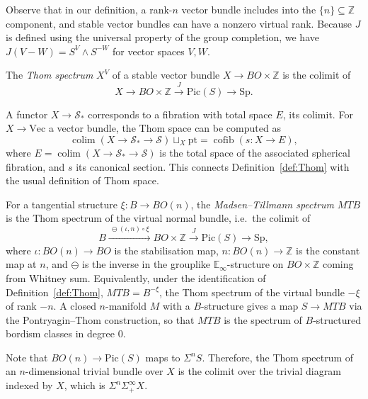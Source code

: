\documentclass{amsart}
\begin{document}
\begin{remark}
\label{rmk:J-on-virtual-bundles}
Observe that in our definition, a rank-$n$ vector bundle includes into the $\{n\} \subseteq \mathbb{Z}$ component, and stable vector bundles can have a nonzero virtual rank. Because $J$ is defined using the universal property of the group completion, we have $J(V - W) = S^V \wedge S^{-W}$ for vector spaces $V, W$.
\end{remark}

\begin{definition}
\label{def:Thom}
The \emph{Thom spectrum} $X^V$ of a stable vector bundle $X \to BO \times \mathbb{Z}$ is the colimit of
\[
X \to BO \times \mathbb{Z} \xrightarrow{\ J\ } \mathrm{Pic}(S) \to \mathrm{Sp}.
\]
\end{definition}

\begin{remark}
\label{rmk:Thom-as-cofib}
A functor $X \to \mathcal{S}_*$ corresponds to a fibration with total space $E$, its colimit. For $X \to \mathrm{Vec}$ a vector bundle, the Thom space can be computed as
\[
\operatorname*{colim}(X \to \mathcal{S}_* \to \mathcal{S}) \sqcup_X \mathrm{pt} = \operatorname*{cofib}(s \colon X \to E),
\]
where $E = \operatorname*{colim}(X \to \mathcal{S}_* \to \mathcal{S})$ is the total space of the associated spherical fibration, and $s$ its canonical section. This connects Definition~\ref{def:Thom} with the usual definition of Thom space.
\end{remark}

\begin{definition}
\label{def:MTB}
For a tangential structure $\xi \colon B \to BO(n)$, the \emph{Madsen--Tillmann spectrum} $MTB$ is the Thom spectrum of the virtual normal bundle, i.e.\ the colimit of
\[
B \xrightarrow{\ \ominus(\iota, n) \circ \xi\ } BO \times \mathbb{Z} \xrightarrow{\ J\ } \mathrm{Pic}(S) \to \mathrm{Sp},
\]
where $\iota \colon BO(n) \to BO$ is the stabilisation map, $n \colon BO(n) \to \mathbb{Z}$ is the constant map at $n$, and $\ominus$ is the inverse in the grouplike $\mathbb{E}_\infty$-structure on $BO \times \mathbb{Z}$ coming from Whitney sum. Equivalently, under the identification of Definition~\ref{def:Thom}, $MTB = B^{-\xi}$, the Thom spectrum of the virtual bundle $-\xi$ of rank $-n$. A closed $n$-manifold $M$ with a $B$-structure gives a map $S \to MTB$ via the Pontryagin--Thom construction, so that $MTB$ is the spectrum of $B$-structured bordism classes in degree $0$.
\end{definition}
\begin{example}
\label{ex:trivial-bundle}
Note that $BO(n) \to \mathrm{Pic}(S)$ maps to $\Sigma^n S$. Therefore, the Thom spectrum of an $n$-dimensional trivial bundle over $X$ is the colimit over the trivial diagram indexed by $X$, which is $\Sigma^n \Sigma^\infty_+ X$.
\end{example}
\end{document}
